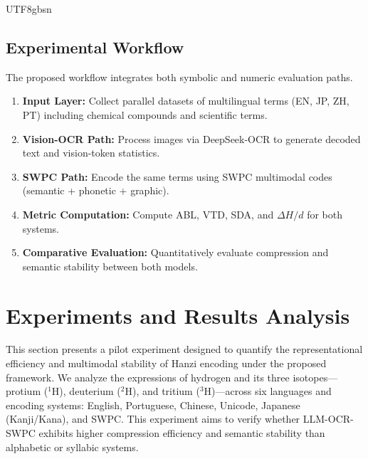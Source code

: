 \documentclass[conference]{IEEEtran}
\begin{document}
\begin{CJK*}{UTF8}{gbsn}
\subsection{Experimental Workflow}

The proposed workflow integrates both symbolic and numeric evaluation paths. %


\begin{enumerate}
    \item \textbf{Input Layer:} Collect parallel datasets of multilingual terms (EN, JP, ZH, PT) including chemical compounds and scientific terms.  
    \item \textbf{Vision-OCR Path:} Process images via DeepSeek-OCR to generate decoded text and vision-token statistics.  
    \item \textbf{SWPC Path:} Encode the same terms using SWPC multimodal codes (semantic + phonetic + graphic).  
    \item \textbf{Metric Computation:} Compute ABL, VTD, SDA, and $\Delta H/d$ for both systems.  
    \item \textbf{Comparative Evaluation:} Quantitatively evaluate compression and semantic stability between both models.
\end{enumerate}

\section{Experiments and Results Analysis}
\label{sec:results}

This section presents a pilot experiment designed to quantify the representational efficiency and multimodal stability of Hanzi encoding under the proposed framework.  
We analyze the expressions of hydrogen and its three isotopes—protium ($^{1}$H), deuterium ($^{2}$H), and tritium ($^{3}$H)—across six languages and encoding systems: English, Portuguese, Chinese, Unicode, Japanese (Kanji/Kana), and SWPC.  
This experiment aims to verify whether LLM-OCR-SWPC exhibits higher compression efficiency and semantic stability than alphabetic or syllabic systems.


\end{CJK*}
\end{document}
